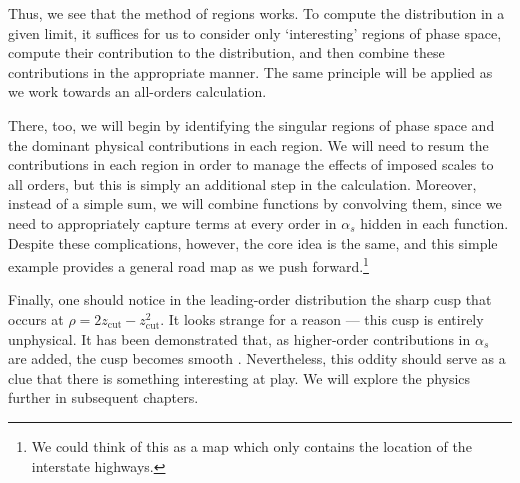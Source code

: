\documentclass[../thesis.tex]{subfiles}
\providecommand{\zcut}{z_\mathrm{{cut}}}
\begin{document}
	Thus, we see that the method of regions works. To compute the distribution in a given limit, it suffices for us to consider only `interesting' regions of phase space, compute their contribution to the distribution, and then combine these contributions in the appropriate manner. The same principle will be applied as we work towards an all-orders calculation. 

	There, too, we will begin by identifying the singular regions of phase space and the dominant physical contributions in each region. We will need to resum the contributions in each region in order to manage the effects of imposed scales to all orders, but this is simply an additional step in the calculation. Moreover, instead of a simple sum, we will combine functions by convolving them, since we need to appropriately capture terms at every order in $\alpha_s$ hidden in each function. Despite these complications, however, the core idea is the same, and this simple example provides a general road map as we push forward.\footnote{We could think of this as a map which only contains the location of the interstate highways.}

	Finally, one should notice in the leading-order distribution the sharp cusp that occurs at $\rho = 2\zcut - \zcut^2$. It looks strange for a reason --- this cusp is entirely unphysical. It has been demonstrated that, as higher-order contributions in $\alpha_s$ are added, the cusp becomes smooth \cite{larkoski_improving_2020}. Nevertheless, this oddity should serve as a clue that there is something interesting at play. We will explore the physics further in subsequent chapters.


%  
% 
\end{document}
